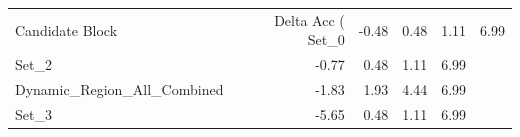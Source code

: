 \begin{tabular}{lrrrr}
\toprule
Candidate Block & Delta Acc (%
\midrule
Set_0 & -0.48 & 0.48 & 1.11 & 6.99 \\
Set_2 & -0.77 & 0.48 & 1.11 & 6.99 \\
Dynamic_Region_All_Combined & -1.83 & 1.93 & 4.44 & 6.99 \\
Set_3 & -5.65 & 0.48 & 1.11 & 6.99 \\
\bottomrule
\end{tabular}
